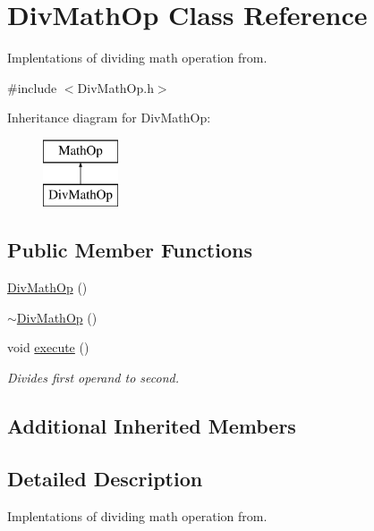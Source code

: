 \hypertarget{class_div_math_op}{}\section{Div\+Math\+Op Class Reference}
\label{class_div_math_op}


Implentations of dividing math operation from.  




{\ttfamily \#include $<$Div\+Math\+Op.\+h$>$}

Inheritance diagram for Div\+Math\+Op\+:\begin{figure}[H]
\begin{center}
\leavevmode
\includegraphics[height=2.000000cm]{class_div_math_op}
\end{center}
\end{figure}
\subsection*{Public Member Functions}
\begin{DoxyCompactItemize}
\item 
\hyperlink{class_div_math_op_a22905b9a716a4fc2ae8be34468b64a9c}{Div\+Math\+Op} ()
\item 
\hyperlink{class_div_math_op_ab805866dfea797dbe8b9dccfb48044be}{$\sim$\+Div\+Math\+Op} ()
\item 
\hypertarget{class_div_math_op_a6055c5d403e4c33fe9ab8add65749891}{}void \hyperlink{class_div_math_op_a6055c5d403e4c33fe9ab8add65749891}{execute} ()\label{class_div_math_op_a6055c5d403e4c33fe9ab8add65749891}

\begin{DoxyCompactList}\small\item\em Divides first operand to second. \end{DoxyCompactList}\end{DoxyCompactItemize}
\subsection*{Additional Inherited Members}


\subsection{Detailed Description}
Implentations of dividing math operation from. 

